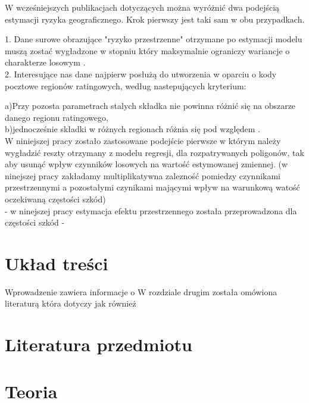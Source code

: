 \documentclass[polish, twoside, 12pt, a4paper]{article}
\theoremstyle{definition}
\theoremstyle{plain}
\theoremstyle{remark}
\begin{document}
W wcześniejszych publikacjach dotyczących można wyróżnić dwa podejścią estymacji ryzyka geograficznego. Krok pierwszy jest taki sam w obu przypadkach.  


1. Dane surowe obrazujące "ryzyko przestrzenne" otrzymane po estymacji modelu muszą zostać wygładzone w stopniu który maksymalnie ograniczy wariancje o charakterze losowym  .  \\
2. Interesujące nas dane najpierw posłużą do utworzenia w oparciu o kody pocztowe regionów ratingowych, według nastepujących kryterium: 

a)Przy pozosta parametrach stalych składka nie powinna różnić się na obszarze danego regionu ratingowego, \\

b)jednocześnie składki w różnych regionach różnia się pod względem .\\


W niniejszej pracy zostało zastosowane podejście pierwsze w którym należy wygładzić reszty otrzymany z modelu regresji, dla rozpatrywanych poligonów, tak aby usunąć wpływ czynników losowych na wartość estymowanej zmiennej.
(w ninejszej pracy zakładamy multiplikatywna zalezność pomiedzy czynnikami przestrzennymi a pozostałymi czynikami mającymi wpływ na warunkową watość oczekiwaną częstości szkód) \\

- w ninejszej pracy estymacja efektu przestrzennego została przeprowadzona dla częstości szkód - 



\clearpage
\section{Układ treści}	
Wprowadzenie zawiera informacje o 
W rozdziale drugim została omówiona literaturą która dotyczy jak również



\clearpage
\section{Literatura przedmiotu}


\clearpage
\section{Teoria}
\end{document}

